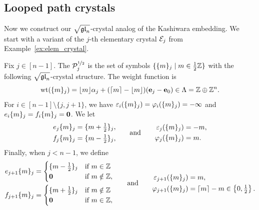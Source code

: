 \documentclass[11pt]{article}
\begin{document}
\subsection{Looped path crystals}

Now we construct our $\sqgln$-crystal analog of the Kashiwara embedding.
We start with a variant of the $j$-th elementary crystal $\cE_j$ from Example~\ref{ex:elem_crystal}.


\begin{definition}
\label{def:looped_path}
Fix $j \in [n-1]$.
The  $\sqrtE_j$ is the set of symbols $\{ \uj{j}{m} \mid m \in \frac{1}{2}\ZZ\}$ with the following $\sqgln$-crystal structure.
The weight function is 
\[
\weight(\uj{j}{m}) = \lfloor m \rfloor \alpha_j + (\lceil m \rceil - \lfloor m \rfloor) (\e_j - \e_0) \in \Lambda = \ZZ\oplus \ZZ^n.
\]
For $i \in [n-1] \setminus \{j, j+1\}$, we have $\varepsilon_i(\uj{j}{m}) = \varphi_i(\uj{j}{m}) = -\infty$ and $e_i\uj{j}{m} = f_i\uj{j}{m} = \zero$.
We let
\[ 
\ba
e_j \uj{j}{m} &=\uj{j}{m+\tfrac{1}{2}},
\\
f_j \uj{j}{m} &=\uj{j}{m-\tfrac{1}{2}},
\ea
\qquand
\ba
\varepsilon_j(\uj{j}{m}) &= -m,  \\
\varphi_j(\uj{j}{m}) &= m.
\ea
\]
Finally, when $j < n - 1$, we define
\[
\ba
e_{j+1} \uj{j}{m} &=\begin{cases}
\uj{j}{m-\tfrac{1}{2}} &\text{if }m \in \ZZ\\
\zero &\text{if }m \notin \ZZ,
\end{cases} 
\\
f_{j+1} \uj{j}{m} &=\begin{cases}
\uj{j}{m+\tfrac{1}{2}}&\text{if }m\notin\ZZ\\
\zero &\text{if }m \in \ZZ,
\end{cases}
\ea
\qquand
\ba
\varepsilon_{j+1}(\uj{j}{m}) &= m,\\
\varphi_{j+1}(  \uj{j}{m}) &=\lceil m \rceil - m \in \left\{0,\tfrac{1}{2}\right\}.
\ea
\]
\end{definition}
\end{document}
